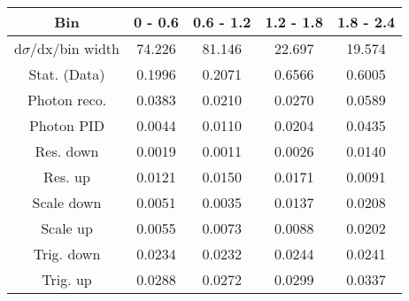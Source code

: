 \documentclass{article}
\begin{document}
\begin{table}[H]
\begin{adjustbox}{width=1.1\textwidth}
\begin{tabular}{|c|c|c|c|c|}
\hline
Bin & 0 - 0.6 & 0.6 - 1.2 & 1.2 - 1.8 & 1.8 - 2.4 \\
\hline
d$\sigma$/dx/bin width & 74.226 & 81.146 & 22.697 & 19.574 \\
\hline
Stat. (Data) & 0.1996 & 0.2071 & 0.6566 & 0.6005 \\
\hline
Photon reco. & 0.0383 & 0.0210 & 0.0270 & 0.0589 \\
\hline
Photon PID & 0.0044 & 0.0110 & 0.0204 & 0.0435 \\
\hline
Res. down & 0.0019 & 0.0011 & 0.0026 & 0.0140 \\
\hline
Res. up & 0.0121 & 0.0150 & 0.0171 & 0.0091 \\
\hline
Scale down & 0.0051 & 0.0035 & 0.0137 & 0.0208 \\
\hline
Scale up & 0.0055 & 0.0073 & 0.0088 & 0.0202 \\
\hline
Trig. down & 0.0234 & 0.0232 & 0.0244 & 0.0241 \\
\hline
Trig. up & 0.0288 & 0.0272 & 0.0299 & 0.0337 \\
\hline
\end{tabular}
\end{adjustbox}
\end{table}
\end{document}
